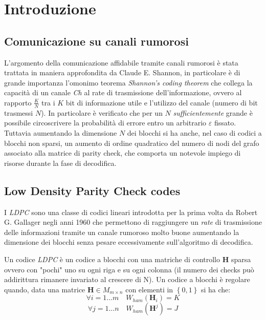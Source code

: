 \section{Introduzione}
	
	\subsection{Comunicazione su canali rumorosi}
	
	L'argomento della comunicazione affidabile tramite canali rumorosi è stata trattata in maniera approfondita da Claude E. Shannon, in particolare è di grande importanza l'omonimo teorema \textit{Shannon's coding theorem} che collega la capacità di un canale \textit{Ch} al rate di trasmissione dell'informazione, ovvero al rapporto $\frac{K}{N}$ tra i $K$ bit di informazione utile e l'utilizzo del canale (numero di bit trasmessi $N$). In particolare è verificato che per un $N$ \textit{sufficientemente} grande è possibile circoscrivere la probabilità di errore entro un arbitrario $\varepsilon$ fissato. Tuttavia aumentando la dimensione $N$ dei blocchi si ha anche, nel caso di codici a blocchi non sparsi, un aumento di ordine quadratico del numero di nodi del grafo associato alla matrice di parity check, che comporta un notevole impiego di risorse durante la fase di decodifica.
	
	\subsection {Low Density Parity Check codes}
	
	I \textit{LDPC} sono una classe di codici lineari introdotta per la prima volta da Robert G. Gallager negli anni 1960 che permettono di raggiungere un \textit{rate} di trasmissione delle informazioni tramite un canale rumoroso molto buone aumentando la dimensione dei blocchi senza pesare eccessivamente sull'algoritmo di decodifica.
	
	Un codice \textit{LDPC} è un codice a blocchi con una matriche di controllo $\textbf{H}$ sparsa ovvero con "pochi" uno su ogni riga e su ogni colonna (il numero dei checks può addirittura rimanere invariato al crescere di N). Un codice a blocchi è regolare quando, data una matrice $\textbf{H} \in M_{m \times n}$ con elementi in $\left\{0,1\right\}$ si ha che:
	\begin{equation}
		\forall i = 1 ... m \quad W_{ham}(\textbf{H}_i) = K
	\end{equation}
	\begin{equation}
		  \forall j =1 ... n \quad W_{ham}(\textbf{H}^j) = J 
	\end{equation}
	
